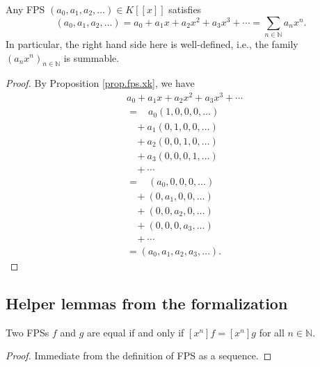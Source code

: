\begin{corollary}
\label{cor.fps.sumakxk}
\leantarget
\leanok
Any FPS $\left(a_{0},a_{1},a_{2},\ldots\right) \in
K\left[\left[x\right]\right]$ satisfies
\[
\left(a_{0},a_{1},a_{2},\ldots\right) = a_{0}+a_{1}x+a_{2}x^{2}+a_{3}%
x^{3}+\cdots = \sum_{n\in\mathbb{N}}a_{n}x^{n}.
\]
In particular, the right hand side here is well-defined, i.e., the family
$\left(a_{n}x^{n}\right)_{n\in\mathbb{N}}$ is summable.
\end{corollary}

\begin{proof}
By Proposition \ref{prop.fps.xk}, we have
\begin{align*}
& a_{0}+a_{1}x+a_{2}x^{2}+a_{3}x^{3}+\cdots\\
& =\ \ \ \ a_{0}\left(1,0,0,0,\ldots\right) \\
& \ \ \ \ +a_{1}\left(0,1,0,0,\ldots\right) \\
& \ \ \ \ +a_{2}\left(0,0,1,0,\ldots\right) \\
& \ \ \ \ +a_{3}\left(0,0,0,1,\ldots\right) \\
& \ \ \ \ +\cdots\\
& =\ \ \ \ \left(a_{0},0,0,0,\ldots\right) \\
& \ \ \ \ +\left(0,a_{1},0,0,\ldots\right) \\
& \ \ \ \ +\left(0,0,a_{2},0,\ldots\right) \\
& \ \ \ \ +\left(0,0,0,a_{3},\ldots\right) \\
& \ \ \ \ +\cdots\\
& =\left(a_{0},a_{1},a_{2},a_{3},\ldots\right).
\end{align*}
\end{proof}

\subsection{Helper lemmas from the formalization}

\begin{lemma}
\label{lem.fps.ext}
\leanhelper
\leanok
Two FPSs $f$ and $g$ are equal if and only if $\left[x^{n}\right]f = \left[x^{n}\right]g$
for all $n\in\mathbb{N}$.
\end{lemma}

\begin{proof}
\leanok
Immediate from the definition of FPS as a sequence.
\end{proof}

